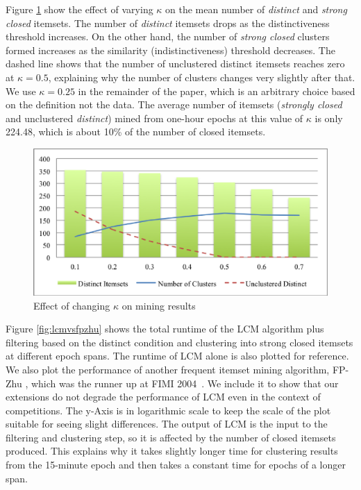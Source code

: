 \documentclass[letterpaper,12pt,titlepage,oneside,final]{book}
\begin{document}

Figure \ref{fig:kappa} show the effect of varying $\kappa$ on the mean number
of \emph{distinct} and \emph{strong closed} itemsets.
The number of \emph{distinct} itemsets drops as the distinctiveness threshold
increases.
On the other hand, the number of \emph{strong closed} clusters formed increases
as the similarity (indistinctiveness) threshold decreases.
The dashed line shows that the number of unclustered distinct itemsets reaches
zero at $\kappa=0.5$, explaining why the number of clusters changes very
slightly after that. 
We use $\kappa = 0.25$ in the remainder of the paper,
which is an arbitrary choice based on the definition not the data.
The average number of itemsets (\emph{strongly closed} and unclustered
\emph{distinct}) mined from one-hour epochs at this value of
$\kappa$ is only 224.48, which is about 10\% of the number of closed itemsets.



\begin{figure}

\includegraphics{kappa_effect.eps}
\caption{Effect of changing $\kappa$ on mining results }
\label{fig:kappa}
\end{figure}



Figure \ref{fig:lcmvsfpzhu} shows the total runtime of the LCM algorithm plus
filtering based on the distinct condition and clustering into strong closed
itemsets at different epoch spans.
The runtime of LCM alone is also plotted for reference.
We also plot the performance of another frequent itemset mining algorithm,
FP-Zhu \cite{grahne2004reducing}, which was the runner up at
FIMI 2004~\cite{DBLP:conf/fimi/2004}.
We include it to show that our extensions do not degrade the performance of
LCM even in the context of competitions.
The y-Axis is in logarithmic scale to keep the scale of the plot suitable for
seeing slight differences.
The output of LCM is the input to the filtering and clustering step,
so it is affected by the number of closed itemsets produced.
This explains why it takes slightly longer time for clustering results from
the 15-minute epoch and then takes a constant time for epochs of a longer span. 
\end{document}
